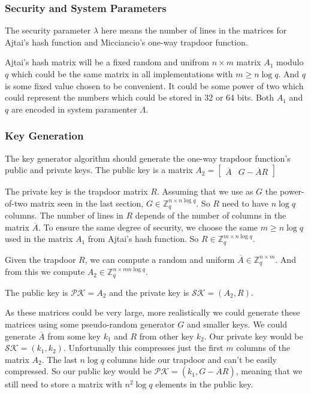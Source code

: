 \documentclass[a4paper]{article}
\begin{document}
\subsubsection{Security and System Parameters}

The security parameter $\lambda$ here means the number of lines in the
matrices for Ajtai's hash function and Micciancio's one-way trapdoor
function.

Ajtai's hash matrix will be a fixed random and unifrom $n \times m$
matrix $A_1$ modulo $q$ which could be the same matrix in all
implementations with $m \geq n \log q$. And $q$ is some fixed value
chosen to be convenient. It could be some power of two which could
represent the numbers which could be stored in 32 or 64 bits. Both
$A_1$ and $q$ are encoded in system paramenter $\Lambda$.

\subsubsection{Key Generation}

The key generator algorithm should generate the one-way trapdoor function's public and private keys. The public key is a matrix $A_2=\begin{bmatrix}\overline{A} & G-\overline{A}R\end{bmatrix}$

The private key is the trapdoor matrix $R$. Assuming that we use as $G$ the power-of-two matrix seen in the last section, $G \in \mathbb{Z}_q^{n \times n \log q}$. So $R$ need to have $n \log q$ columns. The number of lines in $R$ depends of the number of columns in the matrix $\overline{A}$. To ensure the same degree of security, we choose the same $m \geq n \log q$ used in the matrix $A_1$ from Ajtai's hash function. So $R\in \mathbb{Z}_q^{m \times n \log q}$.

Given the trapdoor $R$, we can compute a random and uniform $\overline{A}\in \mathbb{Z}_q^{n \times m}$. And from this we compute $A_2\in\mathbb{Z}_q^{n \times mn \log q}$.

The public key is $\mathcal{PK}=A_2$ and the private key is $\mathcal{SK}=(A_2, R)$.

As these matrices could be very large, more realistically we could generate these matrices using some pseudo-random generator $G$ and smaller keys. We could generate $\overline{A}$ from some key $k_1$ and $R$ from other key $k_2$. Our private key would be $\mathcal{SK}=(k_1, k_2)$. Unfortunally this compresses just the first $m$ columns of the matrix $A_2$. The last $n \log q$ columns hide our trapdoor and can't be easily compressed. So our public key would be $\mathcal{PK}=(k_1, G-\overline{A}R)$, meaning that we still need to store a matrix with $n^2\log q$ elements in the public key.




 {}
 
\end{document}
